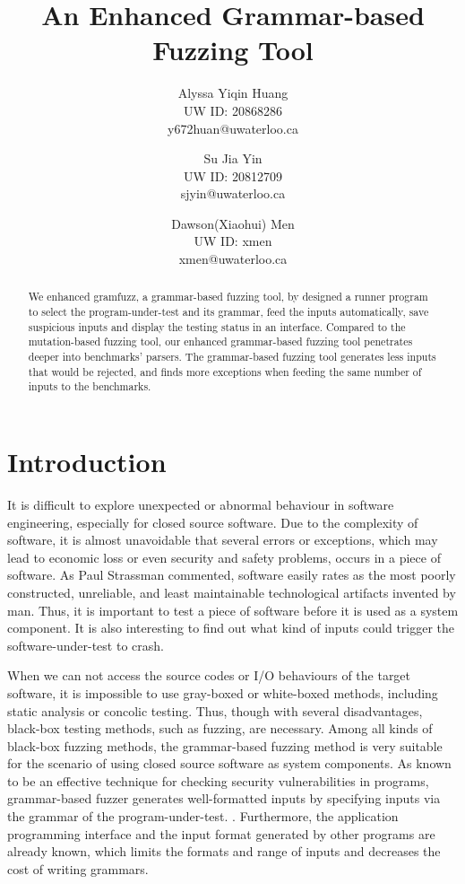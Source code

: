 \documentclass[11pt,a4paper]{article}
\author{
    Alyssa Yiqin Huang\\
    UW ID: 20868286\\
    y672huan@uwaterloo.ca
    \and
    Su Jia Yin\\
    UW ID: 20812709\\
    sjyin@uwaterloo.ca
    \and
    Dawson(Xiaohui) Men\\
    UW ID: xmen\\
    xmen@uwaterloo.ca
}
\title{An Enhanced Grammar-based Fuzzing Tool}
\begin{document}
\setlength{\parskip}{1em} 
\setlength{\parindent}{2em}
\maketitle

\begin{abstract}
    We enhanced {\cc gramfuzz}, a grammar-based fuzzing tool, by designed a runner program to select the program-under-test and its grammar, feed the inputs automatically, save suspicious inputs and display the testing status in an interface. Compared to the mutation-based fuzzing tool, our enhanced grammar-based fuzzing tool penetrates deeper into benchmarks' parsers. The grammar-based fuzzing tool generates less inputs that would be rejected, and finds more exceptions when feeding the same number of inputs to the benchmarks. 
\end{abstract}

\section{Introduction}
It is difficult to explore unexpected or abnormal behaviour in software engineering, especially for closed source software.\cite{fuzzingbook2020}  Due to the complexity of software, it is almost unavoidable that several errors or exceptions, which may lead to economic loss or even security and safety problems, occurs in a piece of software. As Paul Strassman commented, software easily rates as the most poorly constructed, unreliable, and least maintainable technological artifacts invented by man. Thus, it is important to test a piece of software before it is used as a system component. It is also interesting to find out what kind of inputs could trigger the software-under-test to crash.

When we can not access the source codes or I/O behaviours of the target software, it is impossible to use gray-boxed or white-boxed methods, including static analysis or concolic testing. Thus, though with several disadvantages, black-box testing methods, such as fuzzing, are necessary.\cite{fell2017review} Among all kinds of black-box fuzzing methods, the grammar-based fuzzing method is very suitable for the scenario of using closed source software as system components.\cite{6650258,seal2016optimzing} As known to be an effective technique for checking security vulnerabilities in programs, grammar-based fuzzer generates well-formatted inputs by specifying inputs via the grammar of the program-under-test. \cite{8636353,7958599}. Furthermore, the application programming interface and the input format generated by other programs are already known, which limits the formats and range of inputs and decreases the cost of writing grammars.
\end{document}
